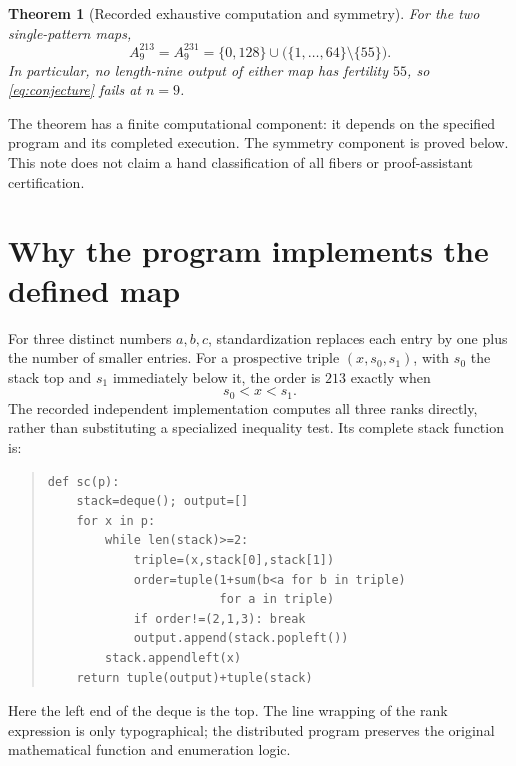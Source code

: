 \documentclass[11pt,a4paper]{article}
\newtheorem{theorem}{Theorem}
\begin{document}
\begin{theorem}[Recorded exhaustive computation and symmetry]\label{thm:main}
For the two single-pattern maps,
\begin{equation}\label{eq:spectrum}
 A_9^{213}=A_9^{231}
   =\{0,128\}\cup\bigl(\{1,\ldots,64\}\setminus\{55\}\bigr).
\end{equation}
In particular, no length-nine output of either map has fertility $55$,
so \eqref{eq:conjecture} fails at $n=9$.
\end{theorem}

The theorem has a finite computational component: it depends on the
specified program and its completed execution. The symmetry component
is proved below. This note does not claim a hand classification of all
fibers or proof-assistant certification.

\section{Why the program implements the defined map}
For three distinct numbers $a,b,c$, standardization replaces each
entry by one plus the number of smaller entries. For a prospective
triple $(x,s_0,s_1)$, with $s_0$ the stack top and $s_1$ immediately
below it, the order is $213$ exactly when
\begin{equation}\label{eq:blocked}
 s_0<x<s_1.
\end{equation}
The recorded independent implementation computes all three ranks
directly, rather than substituting a specialized inequality test.
Its complete stack function is:
\begin{quote}\small
\begin{verbatim}
def sc(p):
    stack=deque(); output=[]
    for x in p:
        while len(stack)>=2:
            triple=(x,stack[0],stack[1])
            order=tuple(1+sum(b<a for b in triple)
                        for a in triple)
            if order!=(2,1,3): break
            output.append(stack.popleft())
        stack.appendleft(x)
    return tuple(output)+tuple(stack)
\end{verbatim}
\end{quote}
Here the left end of the deque is the top. The line wrapping of the
rank expression is only typographical; the distributed program preserves
the original mathematical function and enumeration logic.
\end{document}
